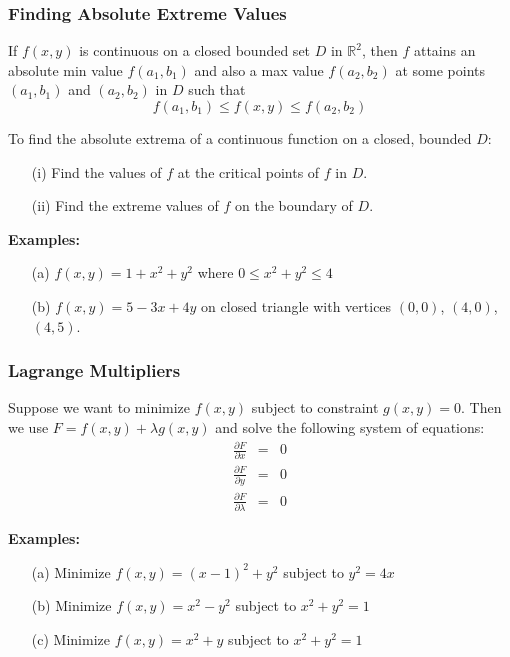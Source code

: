 \documentclass{beamer}
\begin{document}
\begin{frame}
\frametitle{Finding Absolute Extreme Values}
\begin{theorem}
	If $f(x,y)$ is continuous on a closed bounded set $D$ in $\mathbb{R}^2$, then $f$ attains an absolute min value $f(a_1,b_1)$ and also a max value $f(a_2,b_2)$ at some points $(a_1,b_1)$ and $(a_2,b_2)$ in $D$ such that
	$$f(a_1,b_1) \leq f(x,y) \leq f(a_2,b_2)$$
\end{theorem}

To find the absolute extrema of a continuous function on a closed, bounded $D$:
\begin{itemize}
	\item[(i)] Find the values of $f$ at the critical points of $f$ in $D$.
	\item[(ii)] Find the extreme values of $f$ on the boundary of $D$.
\end{itemize}

\vspace{6pt}
\textbf{Examples:}\\
\begin{itemize}
	\item[(a)] $f(x,y) = 1+x^2+y^2$ where $0 \leq x^2+y^2 \leq 4$
	\item[(b)] $f(x,y) = 5-3x+4y$ on closed triangle with vertices $(0,0)$, $(4,0)$, $(4,5)$.
\end{itemize}
\end{frame}


\begin{frame}
\frametitle{Lagrange Multipliers}
Suppose we want to minimize $f(x,y)$ subject to constraint $g(x,y)=0$. Then we use $F=f(x,y) + \lambda g(x,y)$ and solve the following system of equations:
\begin{eqnarray*}
	\frac{\partial F}{\partial x} &=& 0\\
	\frac{\partial F}{\partial y} &=& 0\\
	\frac{\partial F}{\partial \lambda} &=& 0
\end{eqnarray*}

\vspace{6pt}
\textbf{Examples:}
\begin{itemize}
	\item[(a)] Minimize $f(x,y) = (x-1)^2 +y^2$ subject to $y^2=4x$
	\item[(b)] Minimize $f(x,y) = x^2-y^2$ subject to $x^2+y^2 = 1$
	\item[(c)] Minimize $f(x,y) = x^2 + y$ subject to $x^2+y^2 = 1$
	
\end{itemize}
\end{frame}
\end{document}
